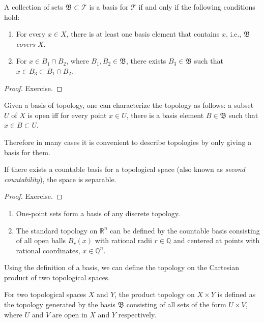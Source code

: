 \documentclass[english,letterpaper]{article}%
\numberwithin{equation}{section}
\numberwithin{figure}{section}
\numberwithin{table}{section}
\theoremstyle{definition}
\theoremstyle{definition}
\theoremstyle{definition}
\theoremstyle{plain}
\theoremstyle{plain}
\theoremstyle{plain}
\theoremstyle{plain}
\theoremstyle{remark}
\theoremstyle{remark}
\begin{document}
\begin{prop}
A collection of sets $\mathfrak{B}\subset\mathcal{T}$ is a basis for $\mathcal{T}$ if and only if the following conditions hold:
\begin{enumerate}
    \item For every $x\in X$, there is at least one basis element that contains $x$, i.e., $\mathfrak{B}$ \emph{covers} $X$.
    \item For $x\in B_1 \cap B_2$, where $B_1,B_2\in\mathfrak{B}$, there exists $B_3\in\mathfrak{B}$ such that $x\in B_3\subset B_1\cap B_2 $.
\end{enumerate}
\end{prop}
\begin{proof}
Exercise.
\end{proof}
\begin{prop}\label{characterization of topology using basis}
Given a basis of topology, one can characterize the topology as follows: a subset $U$ of $X$ is open iff for every point $x\in U$, there is a basis element $B\in \mathfrak{B}$ such that $x\in B\subset U$.
\end{prop} 
Therefore in many cases it is convenient to describe topologies by only giving a basis for them.

\begin{prop}
If there exists a countable basis for a topological space (also known as \emph{second countability}), the space is separable.
\end{prop}
\begin{proof}
Exercise.
\end{proof}

\begin{example}\label{examples of basis of topology}
\begin{enumerate}
    \item One-point sets form a basis of any discrete topology.
    \item The standard topology on $\mathbb{R}^n$ can be defined by the countable basis consisting of all open balls $B_{r}(x)$ with rational radii $r\in\mathbb{Q}$ and centered at points with rational coordinates, $x\in\mathbb{Q}^n$.
\end{enumerate}
\end{example}

Using the definition of a basis, we can define the topology on the Cartesian product of two topological spaces.

\begin{defn}
For two topological spaces $X$ and $Y$, the product topology on $X\times Y$ is defined as the topology generated by the basis $\mathfrak{B}$ consisting of all sets of the form $U\times V$, where $U$ and $V$ are open in $X$ and $Y$ respectively.
\end{defn}
\end{document}
